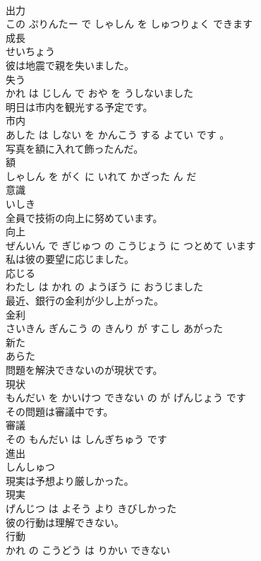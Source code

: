 \documentclass[8pt]{extreport}
\begin{document}
\begin{CJK}{UTF8}{min}
\\	出力 
\\	この ぷりんたー で しゃしん を しゅつりょく できます			
\\	成長	
\\	せいちょう			
\\	彼は地震で親を失いました。	
\\	失う 
\\	かれ は じしん で おや を うしないました			
\\	明日は市内を観光する予定です。	
\\	市内 
\\	あした は しない を かんこう する よてい です 。			
\\	写真を額に入れて飾ったんだ。	
\\	額 
\\	しゃしん を がく に いれて かざった ん だ			
\\	意識	
\\	いしき			
\\	全員で技術の向上に努めています。	
\\	向上 
\\	ぜんいん で ぎじゅつ の こうじょう に つとめて います			
\\	私は彼の要望に応じました。	
\\	応じる 
\\	わたし は かれ の ようぼう に おうじました			
\\	最近、銀行の金利が少し上がった。	
\\	金利 
\\	さいきん ぎんこう の きんり が すこし あがった			
\\	新た	
\\	あらた			
\\	問題を解決できないのが現状です。	
\\	現状 
\\	もんだい を かいけつ できない の が げんじょう です			
\\	その問題は審議中です。	
\\	審議 
\\	その もんだい は しんぎちゅう です			
\\	進出	
\\	しんしゅつ			
\\	現実は予想より厳しかった。	
\\	現実 
\\	げんじつ は よそう より きびしかった			
\\	彼の行動は理解できない。	
\\	行動 
\\	かれ の こうどう は りかい できない			

\end{CJK}
\end{document}
